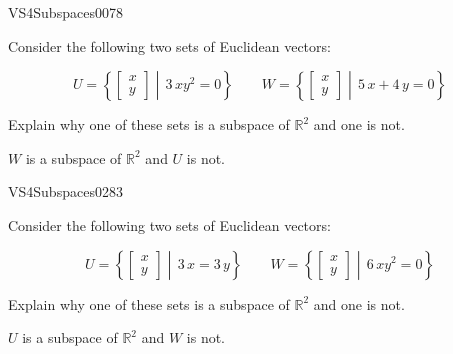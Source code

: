 \begin{exercise}{VS4}{Subspaces}{0078} 
\begin{exerciseStatement} 

Consider the following two sets of Euclidean vectors: 

 \[
          U=\left\{ \left[\begin{array}{c}
x \\
y
\end{array}\right] \middle|\,3 \, x y^{2} = 0\right\} \hspace{2em}  W=\left\{ \left[\begin{array}{c}
x \\
y
\end{array}\right] \middle|\,5 \, x + 4 \, y = 0\right\}
    \] 

 Explain why one of these sets is a subspace of \(\mathbb{R}^2\) and one is not. 

 \end{exerciseStatement}
 \begin{exerciseAnswer} 

\(W\) is a subspace of \(\mathbb{R}^2\) and \(U\) is not.

 \end{exerciseAnswer}
 \end{exercise}


\newpage




\begin{exercise}{VS4}{Subspaces}{0283} 
\begin{exerciseStatement} 

Consider the following two sets of Euclidean vectors: 

 \[
          U=\left\{ \left[\begin{array}{c}
x \\
y
\end{array}\right] \middle|\,3 \, x = 3 \, y\right\} \hspace{2em}  W=\left\{ \left[\begin{array}{c}
x \\
y
\end{array}\right] \middle|\,6 \, x y^{2} = 0\right\}
    \] 

 Explain why one of these sets is a subspace of \(\mathbb{R}^2\) and one is not. 

 \end{exerciseStatement}
 \begin{exerciseAnswer} 

\(U\) is a subspace of \(\mathbb{R}^2\) and \(W\) is not.

 \end{exerciseAnswer}
 \end{exercise}



